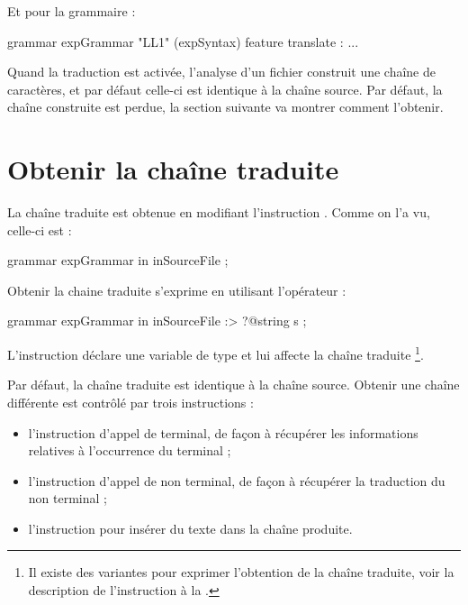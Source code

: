 Et pour la grammaire :
\begin{galgascode}
grammar expGrammar "LL1" (expSyntax) feature translate :
  ...
\end{galgascode}

Quand la traduction est activée, l'analyse d'un fichier construit une chaîne de caractères, et par défaut celle-ci est identique à la chaîne source. Par défaut, la chaîne construite est perdue, la section suivante va montrer comment l'obtenir.








\section{Obtenir la chaîne traduite}

La chaîne traduite est obtenue en modifiant l'instruction . Comme on l'a vu, celle-ci est : 
\begin{galgascode}
grammar expGrammar in inSourceFile ;
\end{galgascode}

Obtenir la chaine traduite s'exprime en utilisant l'opérateur  \galgas{\:>} :
\begin{galgascode}
grammar expGrammar in inSourceFile :> ?@string s ;
\end{galgascode}

L'instruction déclare une variable  de type  et lui affecte la chaîne traduite \footnote{Il existe des variantes pour exprimer l'obtention de la chaîne traduite, voir la description de l'instruction  à la .}.

Par défaut, la chaîne traduite est identique à la chaîne source. Obtenir une chaîne différente est contrôlé par trois instructions :
\begin{itemize}
  \item l'instruction d'appel de terminal, de façon à récupérer les informations relatives à l'occurrence du terminal ;
  \item l'instruction d'appel de non terminal, de façon à récupérer la traduction du non terminal ;
  \item l'instruction  pour insérer du texte dans la chaîne produite.
\end{itemize}







